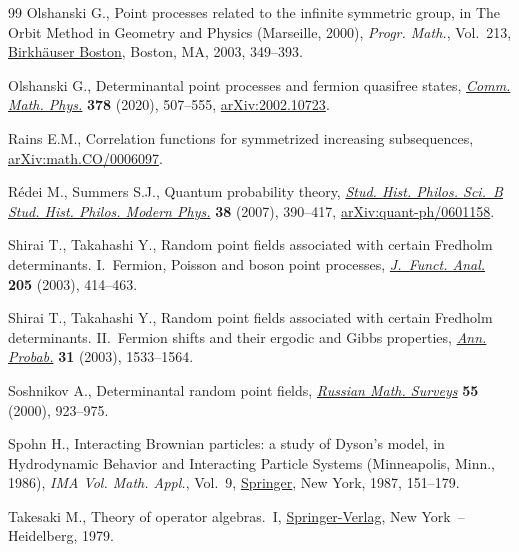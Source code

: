 \documentclass[11pt]{article}
\numberwithin{equation}{section}
\numberwithin{equation}{section}
\begin{document}
\begin{thebibliography}{99}
Olshanski G., Point processes related to the infinite symmetric group, in The
 Orbit Method in Geometry and Physics ({M}arseille, 2000), \textit{Progr.
 Math.}, Vol.~213, \href{https://doi.org/10.1007/978-1-4612-0029-1_15}{Birkh\"auser Boston}, Boston, MA, 2003, 349--393.

Olshanski G., Determinantal point processes and fermion quasifree states,
 \href{https://doi.org/10.1007/s00220-020-03716-1}{\textit{Comm. Math. Phys.}} \textbf{378} (2020), 507--555,
 \href{https://arxiv.org/abs/2002.10723}{arXiv:2002.10723}.

Rains E.M., Correlation functions for symmetrized increasing subsequences,
 \href{https://arxiv.org/abs/math.CO/0006097}{arXiv:math.CO/0006097}.

R\'edei M., Summers S.J., Quantum probability theory, \href{https://doi.org/10.1016/j.shpsb.2006.05.006}{\textit{Stud. Hist.
 Philos. Sci.~B Stud. Hist. Philos. Modern Phys.}} \textbf{38} (2007),
 390--417, \href{https://arxiv.org/abs/quant-ph/0601158}{arXiv:quant-ph/0601158}.

Shirai T., Takahashi Y., Random point fields associated with certain {F}redholm
 determinants. {I}.~{F}ermion, {P}oisson and boson point processes,
 \href{https://doi.org/10.1016/S0022-1236(03)00171-X}{\textit{J.~Funct. Anal.}} \textbf{205} (2003), 414--463.

Shirai T., Takahashi Y., Random point fields associated with certain {F}redholm
 determinants. {II}.~{F}ermion shifts and their ergodic and {G}ibbs
 properties, \href{https://doi.org/10.1214/aop/1055425789}{\textit{Ann. Probab.}} \textbf{31} (2003), 1533--1564.

Soshnikov A., Determinantal random point fields, \href{https://doi.org/10.1070/rm2000v055n05ABEH000321}{\textit{Russian Math. Surveys}}
 \textbf{55} (2000), 923--975.

Spohn H., Interacting {B}rownian particles: a study of {D}yson's model, in
 Hydrodynamic Behavior and Interacting Particle Systems ({M}inneapolis,
 {M}inn., 1986), \textit{IMA Vol. Math. Appl.}, Vol.~9, \href{https://doi.org/10.1007/978-1-4684-6347-7_13}{Springer}, New York,
 1987, 151--179.

Takesaki M., Theory of operator algebras.~{I}, \href{https://doi.org/10.1007/978-1-4612-6188-9}{Springer-Verlag}, New York~--
 Heidelberg, 1979.


\end{thebibliography}
\end{document}
